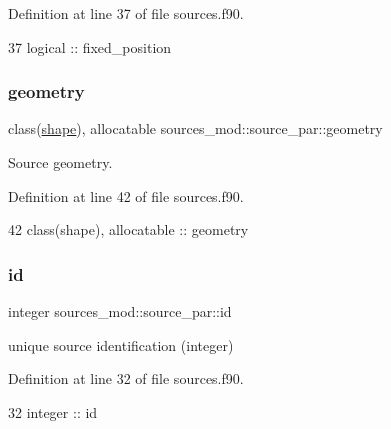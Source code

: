 Definition at line 37 of file sources.\+f90.


\begin{DoxyCode}
37         \textcolor{keywordtype}{logical} :: fixed\_position
\end{DoxyCode}
\mbox{\label{structsources__mod_1_1source__par_abf09d59fd65f02d1a8139e2f9f477207}} 
\subsubsection{\texorpdfstring{geometry}{geometry}}
{\footnotesize\ttfamily class(\mbox{\hyperlink{structgeometry__mod_1_1shape}{shape}}), allocatable sources\+\_\+mod\+::source\+\_\+par\+::geometry\hspace{0.3cm}{\ttfamily [private]}}



Source geometry. 



Definition at line 42 of file sources.\+f90.


\begin{DoxyCode}
42         \textcolor{keywordtype}{class}(shape), \textcolor{keywordtype}{allocatable} :: geometry
\end{DoxyCode}
\mbox{\label{structsources__mod_1_1source__par_a88d333946d18fee527b7b207f44dd3ff}} 
\subsubsection{\texorpdfstring{id}{id}}
{\footnotesize\ttfamily integer sources\+\_\+mod\+::source\+\_\+par\+::id\hspace{0.3cm}{\ttfamily [private]}}



unique source identification (integer) 



Definition at line 32 of file sources.\+f90.


\begin{DoxyCode}
32         \textcolor{keywordtype}{integer} :: id
\end{DoxyCode}
\mbox{\label{structsources__mod_1_1source__par_ac56d7761e7da3a906a3f0fbf4c7f49f8}} 

